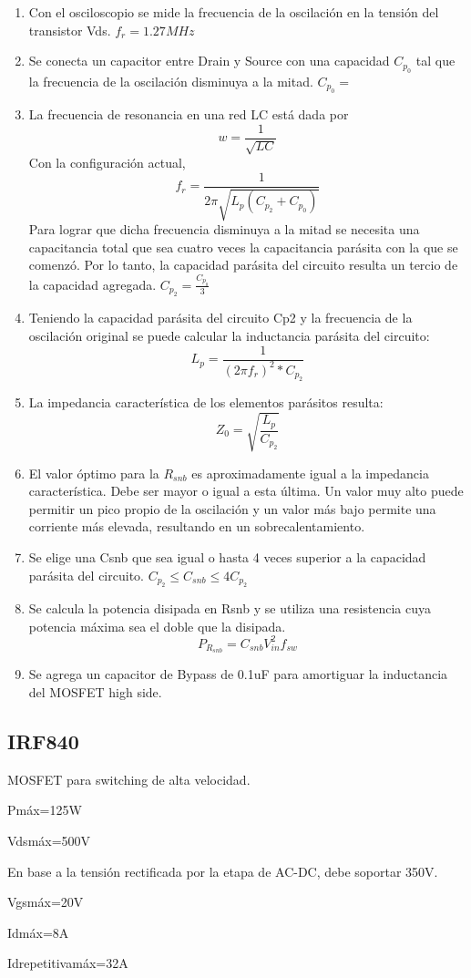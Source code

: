\begin{enumerate}
    \item Con el osciloscopio se mide la frecuencia de la oscilación en la tensión del transistor Vds. $f_{r}=1.27MHz$ %
    \item Se conecta un capacitor entre Drain y Source con una capacidad $C_{p_{0}}$ tal que la frecuencia de la oscilación disminuya a la mitad. $C_{p_{0}}=$
    \item La frecuencia de resonancia en una red LC está dada por
    $$ w=\frac{1}{\sqrt{LC}} $$
    Con la configuración actual, 
    $$ f_{r}=\frac{1}{2\pi\sqrt{L_{p}(C_{p_{2}}+C_{p_{0}})}} $$
    Para lograr que dicha frecuencia disminuya a la mitad se necesita una capacitancia total que sea cuatro veces la capacitancia parásita con la que se comenzó.
    Por lo tanto, la capacidad parásita del circuito resulta un tercio de la capacidad agregada. $C_{p_{2}} = \frac{C_{p_{0}}}{3}$
    \item Teniendo la capacidad parásita del circuito Cp2 y la frecuencia de la oscilación original se puede calcular la inductancia parásita del circuito:
    $$ L_{p}=\frac{1}{(2\pi f_{r})^{2}*C_{p_{2}}} $$
    \item La impedancia característica de los elementos parásitos resulta:
    $$ Z_{0}=\sqrt{\frac{L_p}{C_{p_2}}} $$
    \item El valor óptimo para la $R_{snb}$ es aproximadamente igual a la impedancia característica. Debe ser mayor o igual a esta última. Un valor muy alto puede permitir un pico propio de la oscilación y un valor más bajo permite una corriente más elevada, resultando en un sobrecalentamiento.
    \item Se elige una Csnb que sea igual o hasta 4 veces superior a la capacidad parásita del circuito. $C_{p_2}\leq C_{snb}\leq 4C_{p_2}$
    \item Se calcula la potencia disipada en Rsnb y se utiliza una resistencia cuya potencia máxima sea el doble que la disipada.
    $$ P_{R_{snb}}=C_{snb}V_{in}^2f_{sw} $$
    \item Se agrega un capacitor de Bypass de 0.1uF para amortiguar la inductancia del MOSFET high side.     
\end{enumerate}


\subsection{IRF840}

MOSFET para switching de alta velocidad. 

Pmáx=125W

Vdsmáx=500V

En base a la tensión rectificada por la etapa de AC-DC, debe soportar 350V. 

Vgsmáx=20V
 
Idmáx=8A

Idrepetitivamáx=32A
